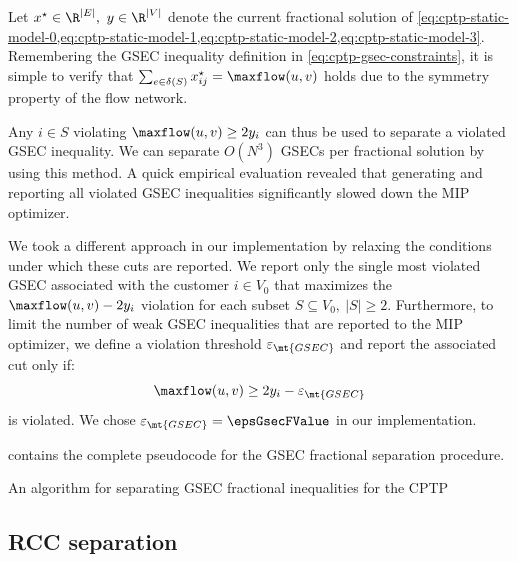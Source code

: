 Let $x^\star \in \R^{|E|},\ y \in \R^{|V|}$ denote the
current fractional solution of
\cref{eq:cptp-static-model-0,eq:cptp-static-model-1,eq:cptp-static-model-2,eq:cptp-static-model-3}.
Remembering the GSEC inequality definition in \cref{eq:cptp-gsec-constraints},
it is simple to verify that $\sum_{e \in \delta(S)} x^\star_{ij} = \maxflow(u, v)$
holds due to the symmetry property of the flow network.

Any $i \in S$ violating $\maxflow(u, v) \ge 2 y_i$ can thus be used to separate a violated GSEC inequality.
We can separate $O(N^3)$ GSECs per fractional solution by using this method.
A quick empirical evaluation revealed that generating
and reporting all violated GSEC inequalities significantly slowed down the MIP optimizer.

\medskip

We took a different approach in our implementation by relaxing the conditions
under which these cuts are reported.
We report only the single most violated GSEC
associated with the customer $i \in V_0$ that maximizes the $\maxflow(u, v) - 2 y_i$ violation
for each subset $S \subseteq V_0,\ |S| \ge 2$.
Furthermore, to limit the number of weak GSEC inequalities that are reported to the MIP optimizer,
we define a violation threshold $\varepsilon_{\mt{GSEC}}$ and report the associated cut only if:
\begin{equation}
	\maxflow(u, v) \ge 2 y_i - \varepsilon_{\mt{GSEC}}
\end{equation}
is violated.
We chose $\varepsilon_{\mt{GSEC}} = \epsGsecFValue$ in our implementation.

 contains the complete pseudocode for the GSEC fractional separation procedure.

\begin{algorithm}
	\caption{An algorithm for separating GSEC fractional inequalities for the CPTP}
	\label{algo:gsec-frac-sep}
	
\end{algorithm}

\subsection{RCC separation}
\label{sec:impl-rcc-separation}

